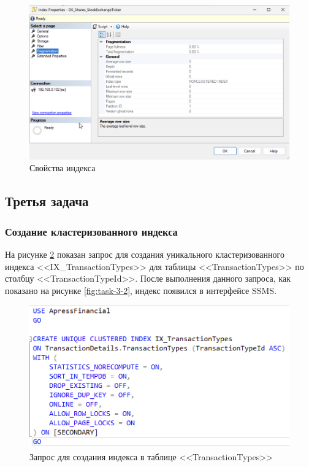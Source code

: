 \documentclass[a4paper, 14pt]{extarticle}
\begin{document}
\begin{figure}[H]
  \centering
  \includegraphics[width=\textwidth]{images/task-2/7.png}
  \caption{Свойства индекса}
  \label{fig:task-2-7}
\end{figure}

\subsection{Третья задача}

\subsubsection{Создание кластеризованного индекса}

На рисунке \ref{fig:task-3-1} показан запрос для создания уникального
кластеризованного индекса <<\foreignlanguage{english}{IX\_TransactionTypes}>>
для таблицы <<\foreignlanguage{english}{TransactionTypes}>> по столбцу
<<\foreignlanguage{english}{TransactionTypeId}>>. После выполнения данного
запроса, как показано на рисунке \ref{fig:task-3-2}, индекс появился в
интерфейсе SSMS.

\begin{figure}[H]
  \centering
  \includegraphics[width=\textwidth]{images/task-3/1.png}
  \caption{Запрос для создания индекса в таблице <<TransactionTypes>>}
  \label{fig:task-3-1}
\end{figure}
\end{document}
